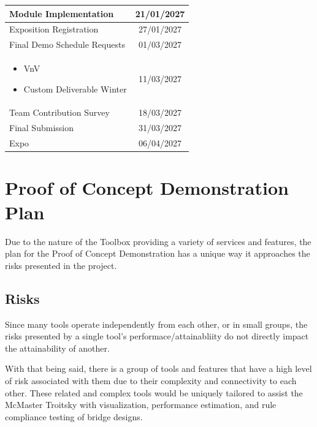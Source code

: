 \documentclass{article}
\begin{document}
\begin{table}[htbp]
\begin{tabular}{@{} m{7.5cm} c @{}}
    Module Implementation & 21/01/2027 \\ 
    \midrule
    
    Exposition Registration & 27/01/2027 \\ 
    \midrule
    
    Final Demo Schedule Requests & 01/03/2027 \\ 
    \midrule
    
    \begin{itemize}[nosep, leftmargin=*]
      \item VnV
      \item Custom Deliverable Winter
    \end{itemize} & 11/03/2027 \\ 
    \midrule
    
    Team Contribution Survey & 18/03/2027 \\ 
    \midrule
    
    Final Submission & 31/03/2027 \\ 
    \midrule
    
    Expo & 06/04/2027 \\ 
    \bottomrule
    \end{tabular}
\end{table}
\clearpage

\section{Proof of Concept Demonstration Plan}
Due to the nature of the Toolbox providing a variety of services and features, the plan for the Proof of Concept Demonstration has a unique way it approaches the risks presented in the project.

\subsection{Risks}
Since many tools operate independently from each other, or in small groups, the risks presented by a single tool's performace/attainabliity do not directly impact the attainability of another.

With that being said, there is a group of tools and features that have a high level of risk associated with them due to their complexity and connectivity to each other.
These related and complex tools would be uniquely tailored to assist the McMaster Troitsky with visualization, performance estimation, and rule compliance testing of bridge designs.
\end{document}
